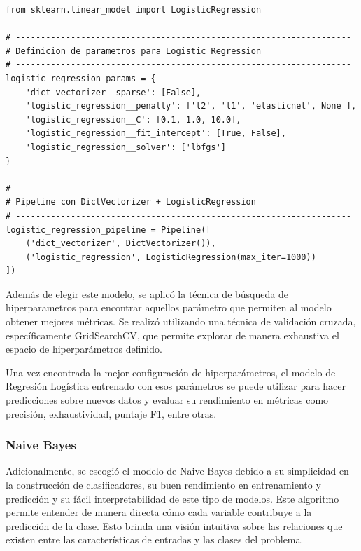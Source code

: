 \documentclass[11pt,a4paper,spanish]{book}
\numberwithin{equation}{chapter}
\numberwithin{figure}{chapter}
\begin{document}
\vspace{5mm}
\begin{lstlisting}
from sklearn.linear_model import LogisticRegression

# -------------------------------------------------------------------
# Definicion de parametros para Logistic Regression
# -------------------------------------------------------------------
logistic_regression_params = {
    'dict_vectorizer__sparse': [False],
    'logistic_regression__penalty': ['l2', 'l1', 'elasticnet', None ],
    'logistic_regression__C': [0.1, 1.0, 10.0],
    'logistic_regression__fit_intercept': [True, False],
    'logistic_regression__solver': ['lbfgs']
}

# -------------------------------------------------------------------
# Pipeline con DictVectorizer + LogisticRegression
# -------------------------------------------------------------------
logistic_regression_pipeline = Pipeline([
    ('dict_vectorizer', DictVectorizer()),
    ('logistic_regression', LogisticRegression(max_iter=1000))
])
\end{lstlisting}


Además de elegir este modelo, se aplicó la técnica de búsqueda de hiperparametros para 
encontrar aquellos parámetro que permiten al modelo obtener mejores métricas. Se realizó 
utilizando una técnica de validación cruzada, específicamente GridSearchCV, que permite 
explorar de manera exhaustiva el espacio de hiperparámetros definido.

Una vez encontrada la mejor configuración de hiperparámetros, el modelo de Regresión 
Logística entrenado con esos parámetros se puede utilizar para hacer predicciones sobre 
nuevos datos y evaluar su rendimiento en métricas como precisión, exhaustividad, 
puntaje F1, entre otras.


\subsubsection{Naive Bayes}

Adicionalmente, se escogió el modelo de Naive Bayes debido a su simplicidad en la 
construcción de clasificadores, su buen rendimiento en entrenamiento y predicción y su 
fácil interpretabilidad de este tipo de modelos. Este algoritmo permite entender de 
manera directa cómo cada variable contribuye a la predicción de la clase. Esto brinda 
una visión intuitiva sobre las relaciones que existen entre las características de 
entradas y las clases del problema.
\end{document}
